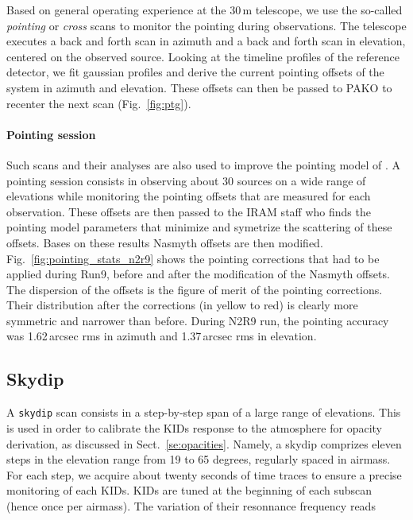 Based on general operating experience at the 30\,m telescope, we use the so-called
{\em pointing} or {\em cross} scans to monitor the pointing during observations. The
telescope executes a back and forth scan in azimuth and a back and forth scan in
elevation, centered on the observed source. Looking at the timeline profiles of
the reference detector, we fit gaussian profiles and derive the current pointing
offsets of the system in azimuth and elevation. These offsets can then be passed
to PAKO to recenter the next scan (Fig.~\ref{fig:ptg}).

\paragraph{Pointing session}
\label{se:pointing_session}

Such scans and their analyses are also used to improve the pointing model of
\nika. A pointing session consists in observing about 30 sources on a wide range
of elevations while monitoring the pointing offsets that are measured for each
observation. These offsets are then passed to the IRAM staff who finds the
pointing model parameters that minimize and symetrize the scattering of these
offsets. Bases on these results Nasmyth offsets are then
modified. Fig.~\ref{fig:pointing_stats_n2r9} shows the pointing corrections that
had to be applied during Run9, before and after the modification of the Nasmyth
offsets. The dispersion of the offsets is the figure of merit of the pointing
corrections. Their distribution after the corrections (in yellow to
red) is clearly more symmetric and narrower than before. During N2R9 run, the
pointing accuracy was 1.62\,arcsec rms in azimuth and 1.37\,arcsec rms in
elevation.

\subsection{Skydip}
\label{se:skydip}

A {\tt skydip} scan consists in a step-by-step span of a large range
of elevations.  This is used in order to calibrate the KIDs response
to the atmosphere for opacity derivation, as discussed in
Sect.~\ref{se:opacities}.  Namely, a skydip comprizes eleven steps in
the elevation range from 19 to 65 degrees, regularly spaced in
airmass. For each step, we acquire about twenty seconds of time traces
to ensure a precise monitoring of each KIDs. KIDs are tuned at the beginning of
each subscan (hence once per airmass). The variation of their resonnance
frequency reads


